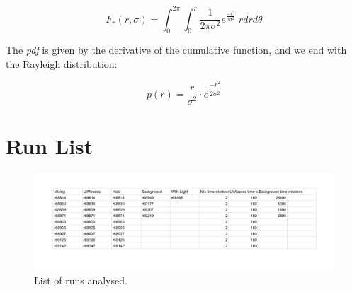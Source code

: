 \documentclass[11pt,a4paper,oneside]{article}
\begin{document}
\begin{equation*}
F_{r}(r, \sigma) =  \int_{0}^{2 \pi} \int_{0}^{r} \frac{1}{2 \pi \sigma^{2}}  e^{ \frac{- r^{2}}{2 \sigma^{2}}} \; r  dr d\theta
\end{equation*}


The \textit{pdf} is given by the derivative of the cumulative function, and we end with the Rayleigh distribution:


\begin{equation}
p(r) = \frac{r}{\sigma^{2}} \cdot  e^{ \dfrac{- r^{2}}{ 2 \sigma^{2}}}
\end{equation}


\section{Run List}
\label{fig:RunList}

\begin{figure}[hbtp]
\centering
\includegraphics[width = 1\textwidth]{../PlotMLEfit/ListofRun-cropped.pdf}
\caption{List of runs analysed.}
\end{figure}
\end{document}
